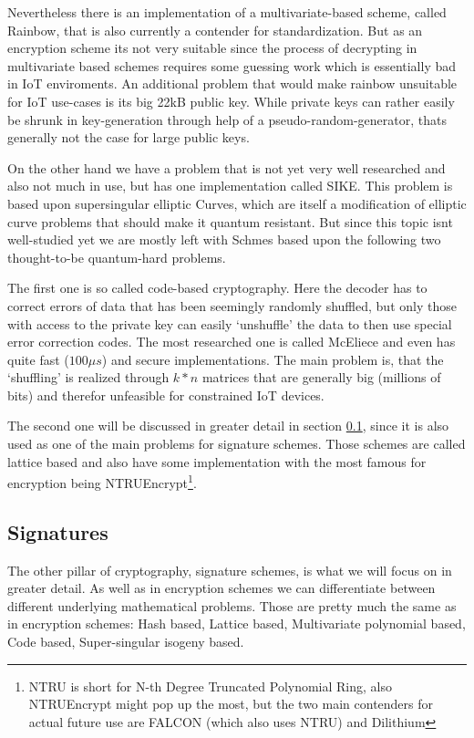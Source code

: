 \documentclass[conference]{IEEEtran}
\newcommand{\comment}[1]{}
\begin{document}
Nevertheless there is an implementation of a multivariate-based scheme, called Rainbow, that is also currently a contender for standardization. But as an encryption scheme its not very suitable since the process of decrypting in multivariate based schemes requires some guessing work \cite{QR_comparison} which is essentially bad in IoT enviroments.
An additional problem that would make rainbow unsuitable for IoT use-cases is its big 22kB public key. While private keys can rather easily be shrunk in key-generation through help of a pseudo-random-generator, thats generally not the case for large public keys.

On the other hand we have a problem that is not yet very well researched and also not much in use, but has one implementation called SIKE. This problem is based upon supersingular elliptic Curves, which are itself a modification of elliptic curve problems that should make it quantum resistant. But since this topic isnt well-studied yet we are mostly left with Schmes based upon the following two thought-to-be quantum-hard problems.

The first one is so called code-based cryptography. Here the decoder has to correct errors of data that has been seemingly randomly shuffled, but only those with access to the private key can easily `unshuffle' the data to then use special error correction codes. 
The most researched one is called McEliece and even has quite fast ($100 \mu s$) and secure implementations. 
The main problem is, that the `shuffling' is realized through $k*n$ matrices that are generally big (millions of bits) and therefor unfeasible for constrained IoT devices.

The second one will be discussed in greater detail in section \ref{QR signatures}, since it is also used as one of the main problems for signature schemes.
Those schemes are called lattice based and also have some implementation with the most famous for encryption being NTRUEncrypt\footnote{NTRU is short for N-th Degree Truncated Polynomial Ring, also NTRUEncrypt might pop up the most, but the two main contenders for actual future use are FALCON (which also uses NTRU) and Dilithium}.

\subsection{Signatures} \label{QR signatures}
\comment{ %
 code-based:   
- McEliece decrypt padded message digest - try thousands of paddings - signing takes 30secs, 4mb priv/pub KEY-size -not feasbale

} %
The other pillar of cryptography, signature schemes, is what we will focus on in greater detail.
As well as in encryption schemes we can differentiate between different underlying mathematical problems. Those are pretty much the same as in encryption schemes: 
Hash based,
Lattice based,
Multivariate polynomial based,
Code based,
Super-singular isogeny based.\cite{QR_sigs}
\end{document}
